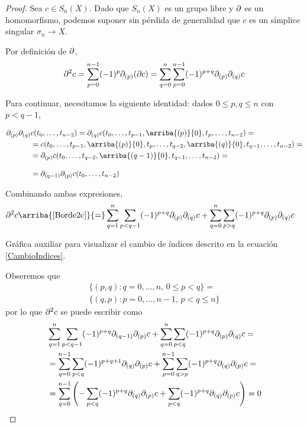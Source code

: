 \begin{proof}
Sea $c \in S_n(X)$. Dado que $S_n(X)$ es un grupo libre y $\partial$ es un
homomorfismo, podemos suponer sin pérdida de generalidad que $c$ es un símplice
singular $\sigma_n \to X$.

Por definición de $\partial$,
\begin{equation}
\label{Borde2c}
\partial^2c=\sum^{n-1}_{p=0}(-1)^p\partial_{(p)}(\partial c)=
\sum^n_{q=0}\sum^{n-1}_{p=0}(-1)^{p+q}\partial_{(p)}\partial_{(q)}c
\end{equation}

Para continuar, necesitamos la siguiente identidad: dados $0 \leq p, q \leq n$
con $p < q-1$,

\begin{align*}
\p_{(p)}\p_{(q)}&c(t_0,\dots,t_{n-2})
	=\p_{(q)}c(t_0,\dots,t_{p-1},\arriba{(p)}{0},t_p,\dots,t_{n-2})=\\
	&=c(t_0,\dots,t_{p-1},\arriba{(p)}{0},t_p,\dots,t_{q-2},
	\arriba{(q)}{0},t_{q-1},\dots,t_{n-2})=\\
	&=\p_{(p)}c(t_0,\dots,t_{q-2},\arriba{(q-1)}{0},t_{q-1},\dots,t_{n-2})=\\[9pt]
	&=\p_{(q-1)}\p_{(p)}c(t_0,\dots,t_{n-2})
\end{align*}

Combinando ambas expresiones,
\begin{align*}
\p^2c
	&\arriba{\eqref{Borde2c}}{=}
	\sum_{q=1}^n\sum_{p < q-1}(-1)^{p+q}\p_{(p)}\p_{(q)}c+
	\sum^n_{q=0}\sum_{p > q}(-1)^{p+q}\p_{(p)}\p_{(q)}c
\end{align*}

\begin{marginfigure}

\caption[Gráfica auxiliar que ilustra el cambio de índices.]{Gráfica auxiliar
para visualizar el cambio de índices descrito en la ecuación
\eqref{CambioIndices}.}
\end{marginfigure}
Obseremos que
\begin{multline} \label{CambioIndices}
\{(p,q)\colon q=0,\dots,n,\, 0\leq p<q\}=\\
\{(q,p)\colon p=0,\dots,n-1,\, p < q \leq n\}
\end{multline}
por lo que $\partial^2c$ se puede escribir como
\begin{align*}
	&\sum_{q=1}^n\sum_{p < q-1}(-1)^{p+q}\partial_{(q-1)}\partial_{(p)}c+
	\sum^n_{q=0}\sum_{p < q}(-1)^{p+q}\partial_{(p)}\partial_{(q)}c=\\ 
	&=\sum_{q=0}^{n-1}\sum_{p < q}(-1)^{p+q+1}\partial_{(q)}\partial_{(p)}c+
	\sum^{n-1}_{p=0}\sum_{q > p}(-1)^{p+q}\partial_{(q)}\partial_{(p)}c=\\
	&=\sum_{q=0}^{n-1}\left(-\sum_{p < q}(-1)^{p+q}\partial_{(q)}\partial_{(p)}c+
	\sum_{p < q}(-1)^{p+q}\partial_{(q)}\partial_{(p)}c\right)=0
\end{align*}
\end{proof}

